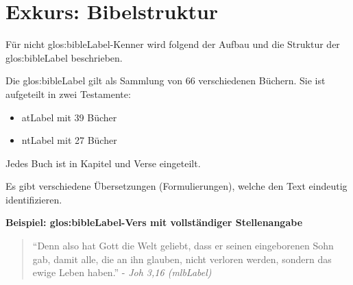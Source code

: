 \section{Exkurs: Bibelstruktur}
Für nicht \gls{glos:bibleLabel}-Kenner wird folgend der Aufbau und die Struktur der \gls{glos:bibleLabel} beschrieben.

Die \gls{glos:bibleLabel} gilt als Sammlung von 66 verschiedenen Büchern.
Sie ist aufgeteilt in zwei Testamente:
\begin{itemize}
	\item \gls{atLabel} mit 39 Bücher
	\item \gls{ntLabel} mit 27 Bücher
\end{itemize}
Jedes Buch ist in Kapitel und Verse eingeteilt.

Es gibt verschiedene Übersetzungen (Formulierungen), welche den Text eindeutig identifizieren.


\begin{framed}
	\textbf{Beispiel: \gls{glos:bibleLabel}-Vers mit vollständiger Stellenangabe}
	\begin{quote}
		"`Denn also hat Gott die Welt geliebt, dass er seinen eingeborenen Sohn gab, damit alle, die an ihn glauben, nicht verloren werden, sondern das ewige Leben haben."' - \textit{Joh 3,16 (\gls{mlbLabel})\footnotemark}
	\end{quote}
\end{framed}
